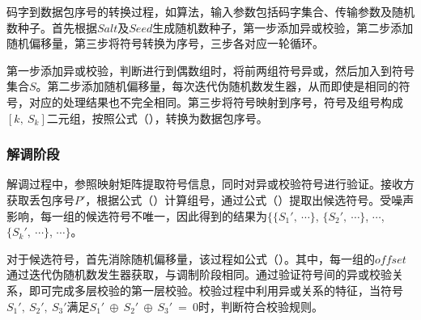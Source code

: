 码字到数据包序号的转换过程，如算法，输入参数包括码字集合、传输参数及随机数种子。首先根据$Salt$及$Seed$生成随机数种子，第一步添加异或校验，第二步添加随机偏移量，第三步将符号转换为序号，三步各对应一轮循环。

第一步添加异或校验，判断进行到偶数组时，将前两组符号异或，然后加入到符号集合$S$。第二步添加随机偏移量，每次迭代伪随机数发生器，从而即使是相同的符号，对应的处理结果也不完全相同。第三步将符号映射到序号，符号及组号构成$[k,\ S_{k}]$二元组，按照公式（），转换为数据包序号。

\subsubsection{解调阶段}
\label{chap:hash:robustness:xor:demodulation}

解调过程中，参照映射矩阵提取符号信息，同时对异或校验符号进行验证。接收方获取丢包序号$P'$，根据公式（）计算组号，通过公式（）提取出候选符号。受噪声影响，每一组的候选符号不唯一，因此得到的结果为$\{\{S_1',\ \cdots\}$, $\{S_2',\ \cdots\}$, $\cdots$, $\{S_k',\ \cdots\}$, $\cdots\}$。

对于候选符号，首先消除随机偏移量，该过程如公式（）。其中，每一组的$offset$通过迭代伪随机数发生器获取，与调制阶段相同。通过验证符号间的异或校验关系，即可完成多层校验的第一层校验。校验过程中利用异或关系的特征，当符号$S_1',\ S_2',\ S_3'$满足$S_1'\ \oplus\ S_2'\ \oplus\ S_3'\ =\ 0$时，判断符合校验规则。